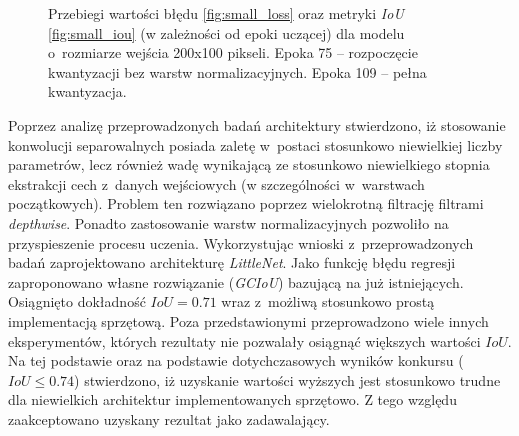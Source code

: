 \begin{figure}
    \caption{Przebiegi wartości błędu \ref{fig:small_loss} oraz metryki \emph{IoU} \ref{fig:small_iou} (w zależności od epoki uczącej) dla modelu o~rozmiarze wejścia 200x100 pikseli.
    Epoka 75 -- rozpoczęcie kwantyzacji bez warstw normalizacyjnych. Epoka 109 -- pełna kwantyzacja.}
    \label{fig:three_step_train}
\end{figure}


Poprzez analizę przeprowadzonych badań architektury stwierdzono, iż stosowanie konwolucji separowalnych posiada zaletę w~postaci stosunkowo niewielkiej liczby parametrów, lecz również wadę wynikającą ze stosunkowo niewielkiego stopnia ekstrakcji cech z~danych wejściowych (w szczególności w~warstwach początkowych). 
Problem ten rozwiązano poprzez wielokrotną filtrację filtrami \emph{depthwise}.
Ponadto zastosowanie warstw normalizacyjnych pozwoliło na przyspieszenie procesu uczenia.
Wykorzystując wnioski z~przeprowadzonych badań zaprojektowano architekturę \emph{LittleNet}.
Jako funkcję błędu regresji zaproponowano własne rozwiązanie (\emph{GCIoU}) bazującą na już istniejących.
Osiągnięto dokładność $IoU = 0.71$ wraz z~możliwą stosunkowo prostą implementacją sprzętową.
Poza przedstawionymi przeprowadzono wiele innych eksperymentów, 
których rezultaty nie pozwalały osiągnąć większych wartości $IoU$.
Na tej podstawie oraz na podstawie dotychczasowych wyników konkursu ($IoU \leq 0.74$) stwierdzono, 
iż uzyskanie wartości wyższych jest stosunkowo trudne dla niewielkich architektur implementowanych sprzętowo.
Z tego względu zaakceptowano uzyskany rezultat jako zadawalający.